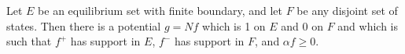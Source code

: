 Let $E$ be an equilibrium set with finite boundary, and let $F$ be any disjoint set of states. Then there is a potential $g = Nf$ which is 1 on $E$ and 0 on $F$ and which is such that $f^+$ has support in $E$, $f^-$ has support in $F$, and $\alpha f \geq 0$.
